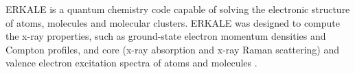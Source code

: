 ERKALE is a quantum chemistry code capable of solving the electronic structure of atoms, molecules and molecular clusters. ERKALE was designed to compute the x-ray properties, such as ground-state electron momentum densities and Compton profiles, and core (x-ray absorption and x-ray Raman scattering) and valence electron excitation spectra of atoms and molecules \cite{Lehtola_2012}. 